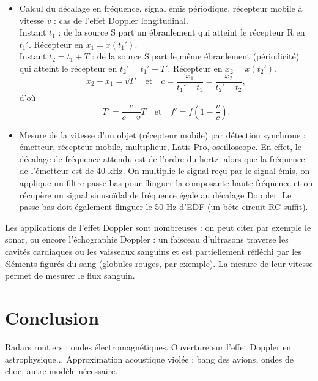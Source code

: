 \documentclass[11pt,a4paper]{report}
\begin{document}
\begin{itemize}
	\item Calcul du décalage en fréquence, signal émis périodique, récepteur mobile à vitesse $v$ : cas de l'effet Doppler longitudinal.\\
	Instant $t_1$ : de la source S part un ébranlement qui atteint le récepteur R en $t_1'$. Récepteur en $x_1 = x(t_1')$.\\
	Instant $t_2 = t_1 + T$ : de la source S part le même ébranlement (périodicité) qui atteint le récepteur en $t_2' = t_1' + T'$. Récepteur en $x_2 = x(t_2')$.\\
	\begin{equation}
		x_2 - x_1 = v T' \quad\text{et}\quad c = \frac{x_1}{t_1' - t_1} = \frac{x_2}{t_2' - t_2},
	\end{equation}
	d'où
	\begin{equation}
		T' = \frac{c}{c-v}T \quad\text{et}\quad f' = f\left(1 - \frac{v}{c}\right).
	\end{equation}
	\item Mesure de la vitesse d'un objet (récepteur mobile) par détection synchrone : émetteur, récepteur mobile, multiplieur, Latis Pro, oscilloscope. En effet, le décalage de fréquence attendu est de l'ordre du hertz, alors que la fréquence de l'émetteur est de 40 kHz. On multiplie le signal reçu par le signal émis, on applique un filtre passe-bas pour flinguer la composante haute fréquence et on récupère un signal sinusoïdal de fréquence égale au décalage Doppler. Le passe-bas doit également flinguer le 50 Hz d'EDF (un bête circuit RC suffit).\\
\end{itemize}

Les applications de l'effet Doppler sont nombreuses : on peut citer par exemple le sonar, ou encore l'échographie Doppler : un faisceau d'ultrasons traverse les cavités cardiaques ou les vaisseaux sanguins et est partiellement réfléchi par les éléments figurés du sang (globules rouges, par exemple). La mesure de leur vitesse permet de mesurer le flux sanguin. 

\section*{Conclusion}

Radars routiers : ondes électromagnétiques. Ouverture sur l'effet Doppler en astrophysique...
Approximation acoustique violée : bang des avions, ondes de choc, autre modèle nécessaire.
\end{document}

